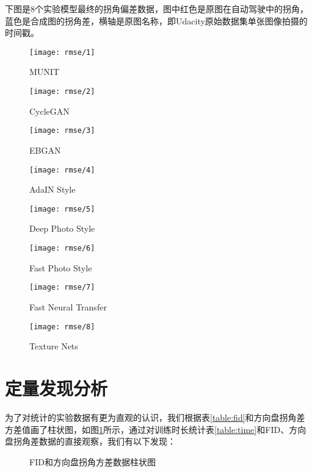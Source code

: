 下图是8个实验模型最终的拐角偏差数据，图中红色是原图在自动驾驶中的拐角，蓝色是合成图的拐角差，横轴是原图名称，即Udacity原始数据集单张图像拍摄的时间戳。

\begin{figure}[!h]
    \texttt{[image: rmse/1]} 
    \caption{MUNIT}
\end{figure}
\begin{figure}[!h]
    \texttt{[image: rmse/2]} 
    \caption{CycleGAN}
\end{figure}
\begin{figure}[!h]
    \texttt{[image: rmse/3]} 
    \caption{EBGAN}
\end{figure}
\begin{figure}[!h]
    \texttt{[image: rmse/4]} 
    \caption{AdaIN Style}
\end{figure}
\begin{figure}[!h]
    \texttt{[image: rmse/5]} 
    \caption{Deep Photo Style}
\end{figure}
\begin{figure}[!h]
    \texttt{[image: rmse/6]} 
    \caption{Fast Photo Style}
\end{figure}
\begin{figure}[!h]
    \texttt{[image: rmse/7]} 
    \caption{Fast Neural Transfer}
\end{figure}
\begin{figure}[!h]
    \texttt{[image: rmse/8]} 
    \caption{Texture Nets}
\end{figure}

\section{定量发现分析}

为了对统计的实验数据有更为直观的认识，我们根据表\ref{table:fid}和方向盘拐角差方差值画了柱状图，如图\ref{fig:col}所示，通过对训练时长统计表\ref{table:time}和FID、方向盘拐角差数据的直接观察，我们有以下发现：

\begin{figure}[ht]
    \centering
    \caption{FID和方向盘拐角方差数据柱状图}
    \label{fig:col}
\end{figure}

